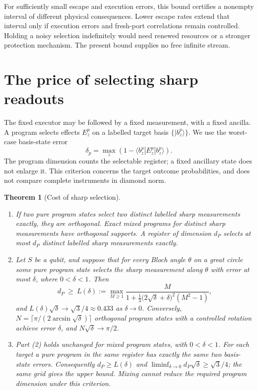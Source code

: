 \documentclass[12pt,a4paper]{article}
\newtheorem{theorem}{Theorem}[section]
\newcommand{\ket}[1]{|#1\rangle}
\begin{document}
For sufficiently small escape and execution errors, this bound certifies a nonempty interval of different physical consequences. Lower escape rates extend that interval only if execution errors and fresh-port correlations remain controlled. Holding a noisy selection indefinitely would need renewed resources or a stronger protection mechanism. The present bound supplies no free infinite stream.

\section{The price of selecting sharp readouts}
\label{sec:sharp}

The fixed executor may be followed by a fixed measurement, with a fixed ancilla. A program selects effects $E_z^p$ on a labelled target basis $\{\ket{b_z^p}\}$. We use the worst-case basis-state error
\[
 \delta_p=\max_z\left(1-\langle b_z^p|E_z^p|b_z^p\rangle\right).
\]
The program dimension counts the selectable register; a fixed ancillary state does not enlarge it. This criterion concerns the target outcome probabilities, and does not compare complete instruments in diamond norm.

\begin{theorem}[Cost of sharp selection]
\label{thm:sharp}
\begin{enumerate}
\item If two pure program states select two distinct labelled sharp measurements exactly, they are orthogonal. Exact mixed programs for distinct sharp measurements have orthogonal supports. A register of dimension $d_P$ selects at most $d_P$ distinct labelled sharp measurements exactly.
\item Let $S$ be a qubit, and suppose that for every Bloch angle $\theta$ on a great circle some pure program state selects the sharp measurement along $\theta$ with error at most $\delta$, where $0<\delta<1$. Then
\begin{equation}
d_P\ \ge\ L(\delta):=\max_{M\ge1}\frac{M}{1+\frac13\bigl(2\sqrt\delta+\delta\bigr)^2(M^2-1)},
\label{eq:lower}
\end{equation}
and $L(\delta)\sqrt\delta\to\sqrt3/4\approx0.433$ as $\delta\to0$. Conversely, $N=\lceil\pi/(2\arcsin\sqrt\delta)\rceil$ orthogonal program states with a controlled rotation achieve error $\delta$, and $N\sqrt\delta\to\pi/2$.
\item Part (2) holds unchanged for mixed program states, with $0<\delta<1$. For each target a pure program in the same register has exactly the same two basis-state errors. Consequently $d_P\ge L(\delta)$ and $\liminf_{\delta\to0}d_P\sqrt\delta\ge\sqrt3/4$; the same grid gives the upper bound. Mixing cannot reduce the required program dimension under this criterion.
\end{enumerate}
\end{theorem}
\end{document}
